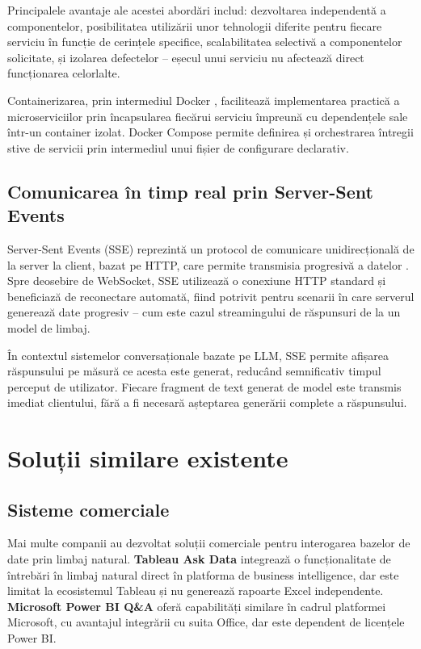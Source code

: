\documentclass[12pt, a4paper]{report}
\begin{document}
Principalele avantaje ale acestei abordări includ: dezvoltarea independentă a componentelor, posibilitatea utilizării unor tehnologii diferite pentru fiecare serviciu în funcție de cerințele specifice, scalabilitatea selectivă a componentelor solicitate, și izolarea defectelor -- eșecul unui serviciu nu afectează direct funcționarea celorlalte.

Containerizarea, prin intermediul Docker \cite{docker}, facilitează implementarea practică a microserviciilor prin încapsularea fiecărui serviciu împreună cu dependențele sale într-un container izolat. Docker Compose permite definirea și orchestrarea întregii stive de servicii prin intermediul unui fișier de configurare declarativ.

\subsection{Comunicarea în timp real prin Server-Sent Events}

Server-Sent Events (SSE) reprezintă un protocol de comunicare unidirecțională de la server la client, bazat pe HTTP, care permite transmisia progresivă a datelor \cite{mdn_sse}. Spre deosebire de WebSocket, SSE utilizează o conexiune HTTP standard și beneficiază de reconectare automată, fiind potrivit pentru scenarii în care serverul generează date progresiv -- cum este cazul streamingului de răspunsuri de la un model de limbaj.

În contextul sistemelor conversaționale bazate pe LLM, SSE permite afișarea răspunsului pe măsură ce acesta este generat, reducând semnificativ timpul perceput de utilizator. Fiecare fragment de text generat de model este transmis imediat clientului, fără a fi necesară așteptarea generării complete a răspunsului.

\section{Soluții similare existente}

\subsection{Sisteme comerciale}

Mai multe companii au dezvoltat soluții comerciale pentru interogarea bazelor de date prin limbaj natural. \textbf{Tableau Ask Data} integrează o funcționalitate de întrebări în limbaj natural direct în platforma de business intelligence, dar este limitat la ecosistemul Tableau și nu generează rapoarte Excel independente. \textbf{Microsoft Power BI Q\&A} oferă capabilități similare în cadrul platformei Microsoft, cu avantajul integrării cu suita Office, dar este dependent de licențele Power BI.
\end{document}

